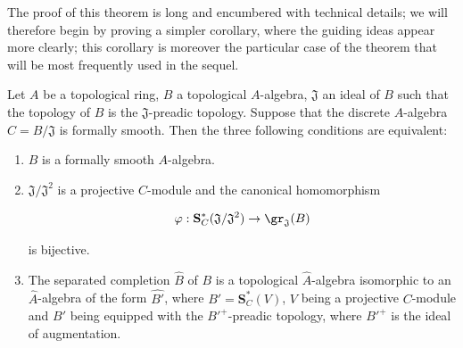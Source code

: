 The proof of this theorem is long and encumbered with technical details;
we will therefore begin by proving a simpler corollary, where the guiding ideas appear more clearly;
this corollary is moreover the particular case of the theorem  that will be most frequently used in the sequel.

\begin{corollary}[19.5.4]
\label{0.19.5.4}
Let $A$ be a topological ring, $B$ a topological $A$-algebra, $\mathfrak{J}$ an ideal of $B$ such that the topology of $B$ is the $\mathfrak{J}$-preadic topology.
Suppose that the discrete $A$-algebra $C=B/\mathfrak{J}$ is formally smooth.
Then the three following conditions are equivalent:
\begin{enumerate}
  \item[a)] $B$ is a formally smooth $A$-algebra.
  \item[b)] $\mathfrak{J}/\mathfrak{J}^2$ is a projective $C$-module and the canonical homomorphism
  
\[
\varphi:\mathbf{S}_C^*(\mathfrak{J}/\mathfrak{J}^2) \to \gr_\mathfrak{J}(B)
\]

  is bijective.
  \item[c)] The separated completion $\widehat{B}$ of $B$ is a topological $\widehat{A}$-algebra isomorphic to an $\widehat{A}$-algebra of the form $\widehat{B'}$, where $B'=\mathbf{S}_C^*(V)$, $V$ being a projective $C$-module and $B'$ being equipped with the ${B'}^+$-preadic topology, where ${B'}^+$ is the ideal of augmentation.
\end{enumerate}
\end{corollary}

